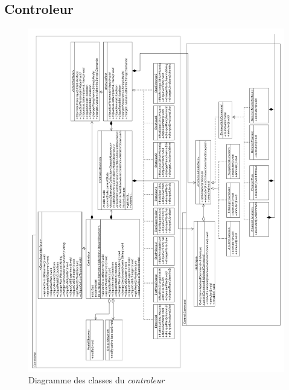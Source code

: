 \documentclass[10pt,a4paper]{book}
\begin{document}
\subsection{Controleur}
\begin{figure}[h!]
    \includegraphics[scale=0.30]{controleur.png}
    \caption{Diagramme des classes du \textit{controleur}}
\end{figure}
\newpage
\end{document}
